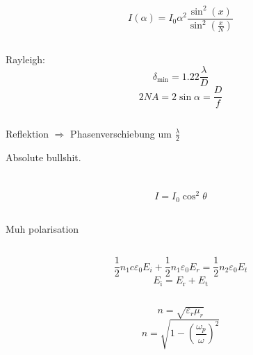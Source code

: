 \documentclass[12pt]{report}
\newcommand{\vepsilon}{\varepsilon}
\begin{document}
\subsection{}

\[I(\alpha)=I_0\alpha^2\frac{\sin^2(x)}{\sin^2\left(\frac{x}{N}\right)}\]

\subsection{}

Rayleigh:
\[\delta_\mathrm{min}=1.22\frac{\lambda}{D}\]
\[2NA=2\sin\alpha=\frac{D}{f}\]

\subsection{}

Reflektion $\Rightarrow$ Phasenverschiebung um $\frac{\lambda}{2}$

Absolute bullshit.

\section{}

\subsection{}

\[I=I_0\cos^2\theta\]

\subsection{}
Muh polarisation

\subsection{}

\[\frac{1}{2}n_1c\vepsilon_0E_i+\frac{1}{2}n_1\vepsilon_0E_r=\frac{1}{2}n_2\vepsilon_0E_t\]
\[E_\mathrm{i}=E_\mathrm{r}+E_\mathrm{t}\]

\subsection{}

\[n=\sqrt{\vepsilon_r\mu_r}\]
\[n=\sqrt{1-\left(\frac{\omega_p}{\omega}\right)^2}\]

\section{}
\end{document}

